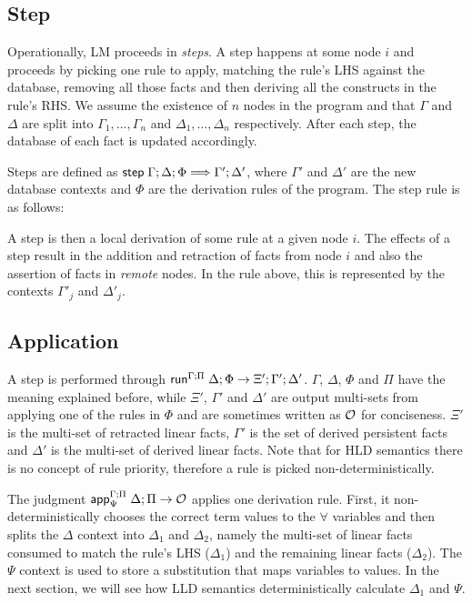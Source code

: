 \subsection{Step}\label{sec:step_hld}

Operationally, LM proceeds in \emph{steps}. A step happens at some node $i$ and
proceeds by picking one rule to apply, matching the rule's LHS against the
database, removing all those facts and then deriving all the
constructs in the rule's RHS. We assume the existence of $n$ nodes in the
program and that $\Gamma$ and $\Delta$ are split into $\Gamma_1, \dotsc,
\Gamma_n$ and $\Delta_1, \dotsc, \Delta_n$ respectively. After each step, the
database of each fact is updated accordingly.

Steps are defined as $\stepz \Gamma; \Delta; \Phi \Longrightarrow \Gamma';
\Delta'$, where $\Gamma'$ and $\Delta'$ are the new database contexts and $\Phi$
are the derivation rules of the program. The step rule is as follows:



A step is then a local derivation of some rule at a given node $i$. The effects
of a step result in the addition and retraction of facts from node $i$ and also
the assertion of facts in \emph{remote} nodes. In the rule above, this is
represented by the contexts $\Gamma'_j$ and $\Delta'_j$.

\subsection{Application}

A step is performed through
$\doz{\Gamma}{\Delta}{\Phi}{\Pi}{\Xi'}{\Gamma'}{\Delta'}$.  $\Gamma$, $\Delta$,
$\Phi$ and $\Pi$ have the meaning explained before, while $\Xi'$, $\Gamma'$ and
$\Delta'$ are output multi-sets from applying one of the rules in $\Phi$ and are
sometimes written as $\outsem$ for conciseness. $\Xi'$ is the multi-set of
retracted linear facts, $\Gamma'$ is the set of derived persistent facts and
$\Delta'$ is the multi-set of derived linear facts.  Note that for HLD semantics
there is no concept of rule priority, therefore a rule is picked
non-deterministically.

The judgment $\az{\Psi}{\Gamma}{\Delta}{\Pi}{A \lolli B}{\outsem}$ applies one
derivation rule. First, it non-deterministically chooses the correct term values to the
$\forall$ variables and then splits the $\Delta$ context into $\Delta_1$ and
$\Delta_2$, namely the multi-set of linear facts consumed to match the rule's
LHS ($\Delta_1$) and the remaining linear facts ($\Delta_2$). The $\Psi$ context
is used to store a substitution that maps variables to values. In the next
section, we will see how LLD semantics deterministically calculate $\Delta_1$
and $\Psi$.

